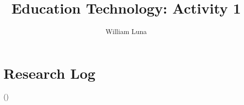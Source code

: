 \documentclass[
	letterpaper, %
]{jdf}
\author{William Luna}
\title{Education Technology: Activity 1}
\begin{document}

\maketitle

\section{Research Log}

(\cite{Lave_Wenger_1991})


\printbibliography{}
\end{document}
